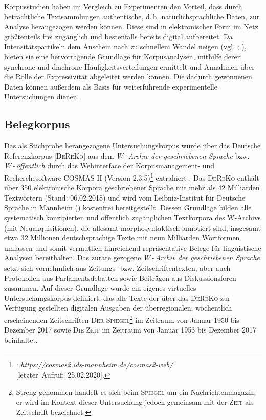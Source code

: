 Korpusstudien haben im Vergleich zu Experimenten den Vorteil, dass durch beträchtliche Textsammlungen authentische, d.\,h. natürlichsprachliche Daten, zur %
Analyse herangezogen werden können. Diese sind in elektronischer Form im Netz größtenteils frei zugänglich und bestenfalls bereits digital aufbereitet. Da Intensitätspartikeln dem Anschein nach zu schnellem Wandel neigen (vgl. \citealt[257]{Ito.2003}; \citealt[281]{Tagliamonte.2005}), bieten sie eine hervorragende Grundlage für Korpusanalysen, mithilfe derer synchrone und diachrone Häufigkeitsverteilungen ermittelt und Annahmen über die Rolle der Expressivität abgeleitet werden können. Die dadurch gewonnenen Daten können außerdem als Basis für weiterführende experimentelle Untersuchungen dienen.

\subsection{Belegkorpus}
Das als Stichprobe herangezogene Untersuchungskorpus wurde über das Deutsche Referenzkorpus [\textsc{DeReKo}] aus dem \textit{W\,-\,Archiv der geschriebenen Sprache} bzw. \textit{W\,-\,öffentlich} durch das Webinterface der Korpusmanagement- und Recherchesoftware \textsc{COSMAS II} (Version 2.3.5)\footnote{\citet[]{COSMAS.2020}: \textit{https://cosmas2.ids-mannheim.de/cosmas2-web/} \mbox{[letzter Aufruf: 25.02.2020]}.} extrahiert \citep[vgl.][]{Kupietz.2010}. Das \textsc{DeReKo} enthält über 350 elektronische Korpora geschriebener Sprache mit mehr als 42 Milliarden Textwörtern (Stand: 06.02.2018) und wird vom Leibniz-Institut für Deutsche Sprache in Mannheim (\citealt[]{IDS.2018}) kostenfrei bereitgestellt. Dessen Grundlage bilden alle systematisch konzipierten und öffentlich zugänglichen Textkorpora des W-Archivs (mit Neuakquisitionen), die allesamt morphosyntaktisch annotiert sind, insgesamt etwa 32 Millionen deutschsprachige Texte mit neun Milliarden Wortformen umfassen und somit vermutlich hinreichend repräsentative Belege für linguistische Analysen bereithalten. Das zurate gezogene \textit{W\,-\,Archiv der geschriebenen Sprache} setzt sich vornehmlich aus Zeitungs- bzw. Zeitschriftentexten, aber auch Protokollen aus Parlamentsdebatten sowie Beiträgen aus Diskussionsforen zusammen. Auf dieser Grundlage wurde ein eigenes virtuelles Untersuchungskorpus definiert, das alle Texte der über das \textsc{DeReKo} zur Verfügung gestellten digitalen Ausgaben der überregionalen, wöchentlich erscheinenden Zeitschriften \textsc{Der Spiegel}\footnote{Streng genommen handelt es sich beim \textsc{Spiegel} um ein Nachrichtenmagazin; er wird im Kontext dieser Untersuchung jedoch gemeinsam mit der \textsc{Zeit} als Zeitschrift bezeichnet.} im Zeitraum von Januar 1950 bis Dezember 2017 sowie \textsc{Die Zeit} im Zeitraum von Januar 1953 bis Dezember 2017 beinhaltet.

